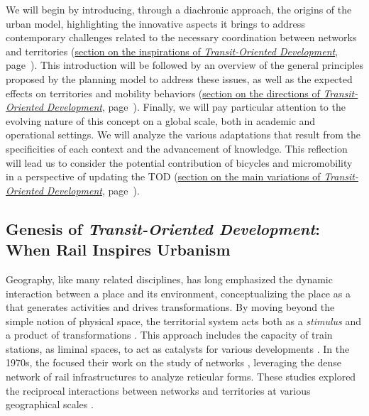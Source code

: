 \begin{refsegment}
We will begin by introducing, through a diachronic approach, the origins of the urban model, highlighting the innovative aspects it brings to address contemporary challenges related to the necessary coordination between networks and territories (\hyperref[chap1:tod-presentation-generale-origines]{section on the inspirations of \textsl{Transit-Oriented Development}}, page~\pageref{chap1:tod-presentation-generale-origines}). This introduction will be followed by an overview of the general principles proposed by the planning model to address these issues, as well as the expected effects on territories and mobility behaviors (\hyperref[chap1:tod-presentation-generale-definition]{section on the directions of \textsl{Transit-Oriented Development}}, page~\pageref{chap1:tod-presentation-generale-definition}). Finally, we will pay particular attention to the evolving nature of this concept on a global scale, both in academic and operational settings. We will analyze the various adaptations that result from the specificities of each context and the advancement of knowledge. This reflection will lead us to consider the potential contribution of bicycles and \gls{micromobility} in a perspective of updating the \acrshort{TOD} (\hyperref[chap1:tod-presentation-generale-declinaisons]{section on the main variations of \textsl{Transit-Oriented Development}}, page~\pageref{chap1:tod-presentation-generale-declinaisons}).%

\subsection{Genesis of \textsl{Transit-Oriented Development}: When Rail Inspires Urbanism
    \label{chap1:tod-presentation-generale-origines}
    }

Geography, like many related disciplines, has long emphasized the dynamic interaction between a place and its environment, conceptualizing the place as a  that generates activities and drives transformations. By moving beyond the simple notion of physical space, the territorial system acts both as a \textsl{stimulus} and a product of transformations \textcolor{blue}{\autocite[19-21]{hagerstrand_what_1970}}. This approach includes the capacity of train stations, as liminal spaces, to act as catalysts for various developments \textcolor{blue}{\autocite[6]{baron_nouvelle_2024}}. In the 1970s, the  focused their work on the study of networks \textcolor{blue}{\autocites{claval_nouveaux_1977}[166]{massardier_savants_1996}[112-113]{orain_geographie_2006}}, leveraging the dense network of rail infrastructures to analyze reticular forms. These studies explored the reciprocal interactions between networks and territories at various geographical scales \textcolor{blue}{\autocite[6]{baron_nouvelle_2024}}.%


\end{refsegment}
